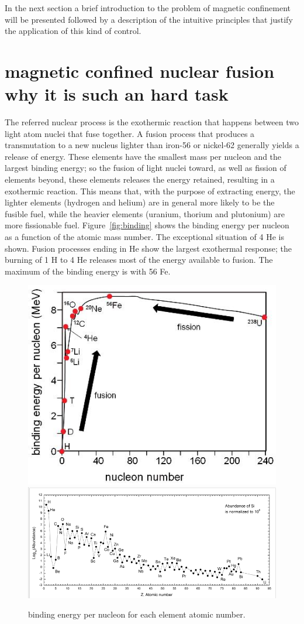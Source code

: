 In the next section a brief introduction to the problem of magnetic confinement will be presented followed by a description of the intuitive principles that justify the application of this kind of control.


\section{magnetic confined nuclear fusion \\ \small{why it is such an hard task}}
The referred nuclear process is the exothermic reaction that happens between two light atom nuclei that fuse together. A fusion process that produces a transmutation to a new nucleus lighter than iron-56 or nickel-62 generally yields a release of energy. These elements have the smallest mass per nucleon and the largest binding energy; so the fusion of light nuclei toward, as well as fission of elements beyond, these elements releases the energy retained, resulting in a exothermic reaction.  This means that, with the purpose of extracting energy, the lighter elements (hydrogen and helium) are in general more likely to be the fusible fuel, while the heavier elements (uranium, thorium and plutonium) are more fissionable fuel. 
Figure~\ref{fig:binding} shows the binding energy per nucleon as a function of the atomic mass number. The exceptional situation of 4 He is shown. Fusion processes ending in He show the largest exothermal response; the burning of 1 H to 4 He releases most of the energy available to fusion. The maximum of the binding energy is with 56 Fe.

\begin{figure}[ht!]
\includegraphics[height=0.25\textwidth]{img/binding_energy.jpg} \centering
\includegraphics[height=0.25\textwidth]{img/abundance.png} \centering
\caption{binding energy per nucleon for each element atomic number. }
\label{binding}
\end{figure}

